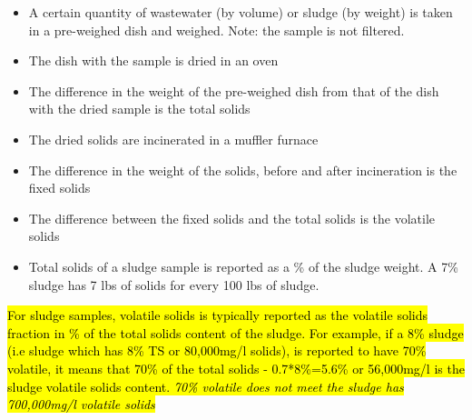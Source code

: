 				\begin{itemize}
					\item A certain quantity of wastewater (by volume) or sludge (by weight) is taken in a pre-weighed dish and weighed.  Note:  the sample is not filtered.
					\item The dish with the sample is dried in an oven
					\item The difference in the weight of the pre-weighed dish from that of the dish with the dried sample is the total solids
					\item The dried solids are incinerated in a muffler furnace
					\item The difference in the weight of the solids, before and after incineration is the fixed solids
					\item The difference between the fixed solids and the total solids is the volatile solids
					\item Total solids of a sludge sample is reported as a \% of the sludge weight.  A 7\% sludge has 7 lbs of solids for every 100 lbs of sludge.
				\end{itemize}
				
							
				
				
					\hl{For sludge samples, volatile solids is typically reported as the volatile solids fraction in \% of the total solids content of the sludge.  For example, if a 8\% sludge (i.e sludge which has 8\% TS or 80,000mg/l solids), is reported to have 70\% volatile, it means that 70\% of the total solids - 0.7*8\%=5.6\% or 56,000mg/l is the sludge volatile solids content.  \emph{70\% volatile does not meet the sludge has 700,000mg/l volatile solids}}\\
				
